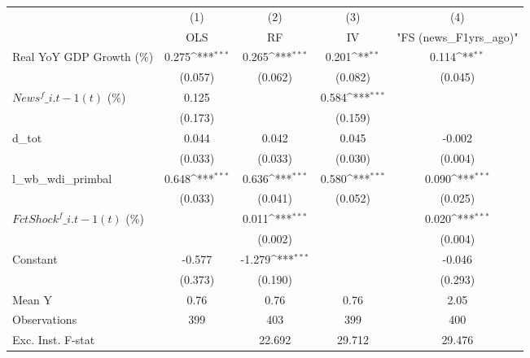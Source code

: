 {
\def\sym#1{\ifmmode^{#1}\else\(^{#1}\)\fi}
\begin{tabular}{l*{4}{c}}
\toprule
                    &\multicolumn{1}{c}{(1)}&\multicolumn{1}{c}{(2)}&\multicolumn{1}{c}{(3)}&\multicolumn{1}{c}{(4)}\\
                    &\multicolumn{1}{c}{OLS}&\multicolumn{1}{c}{RF}&\multicolumn{1}{c}{IV}&\multicolumn{1}{c}{ "FS (news\_F1yrs\_ago)" }\\
\midrule
Real YoY GDP Growth (\%)&       0.275\sym{***}&       0.265\sym{***}&       0.201\sym{**} &       0.114\sym{**} \\
                    &     (0.057)         &     (0.062)         &     (0.082)         &     (0.045)         \\
\addlinespace
$ News^f\_{i.t-1}(t)$ (\%)&       0.125         &                     &       0.584\sym{***}&                     \\
                    &     (0.173)         &                     &     (0.159)         &                     \\
\addlinespace
d\_tot               &       0.044         &       0.042         &       0.045         &      -0.002         \\
                    &     (0.033)         &     (0.033)         &     (0.030)         &     (0.004)         \\
\addlinespace
l\_wb\_wdi\_primbal    &       0.648\sym{***}&       0.636\sym{***}&       0.580\sym{***}&       0.090\sym{***}\\
                    &     (0.033)         &     (0.041)         &     (0.052)         &     (0.025)         \\
\addlinespace
$ FctShock^f\_{i.t-1}(t)$ (\%)&                     &       0.011\sym{***}&                     &       0.020\sym{***}\\
                    &                     &     (0.002)         &                     &     (0.004)         \\
\addlinespace
Constant            &      -0.577         &      -1.279\sym{***}&                     &      -0.046         \\
                    &     (0.373)         &     (0.190)         &                     &     (0.293)         \\
\midrule
Mean Y              &        0.76         &        0.76         &        0.76         &        2.05         \\
Observations        &         399         &         403         &         399         &         400         \\
Exc. Inst. F-stat   &                     &      22.692         &      29.712         &      29.476         \\
\bottomrule
\end{tabular}
}
